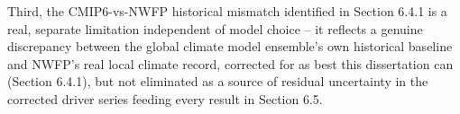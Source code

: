 Third, the CMIP6-vs-NWFP historical mismatch identified in Section 6.4.1 is a real, separate
limitation independent of model choice -- it reflects a genuine discrepancy between the global
climate model ensemble's own historical baseline and NWFP's real local climate record, corrected for
as best this dissertation can (Section 6.4.1), but not eliminated as a source of residual
uncertainty in the corrected driver series feeding every result in Section 6.5.
